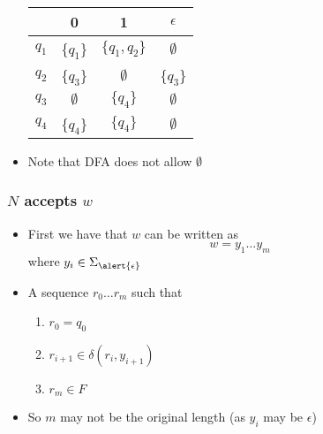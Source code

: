 \begin{frame}[allowframebreaks]
\begin{itemize}
  \begin{center}
  \begin{tabular}{c|ccc}
& 0 & 1 & $\epsilon$\\ 
\hline
$q_1$ & \{$q_1$\} & $\{q_1, q_2\}$ & $\emptyset$\\
$q_2$ & \{$q_3$\} & $\emptyset$ & \{$q_3$\}\\
$q_3$ & $\emptyset$ & $\{q_4\}$ & $\emptyset$\\
$q_4$ & \{$q_4$\} & $\{q_4\}$ & $\emptyset$
  \end{tabular}
\end{center}
\item Note that DFA does not allow $\emptyset$ 
\end{itemize}\end{frame}

\begin{frame}[allowframebreaks] \frametitle{$N$ accepts $w$}
  \begin{itemize}
\item First we have that $w$ can be written as 
  \begin{equation*}
    w = y_1 \ldots y_m
  \end{equation*}
where $y_i \in \Sigma_{\alert{\epsilon}}$
\item A sequence $r_0 \ldots r_m$ such that

  \begin{enumerate}
  \item $r_0=q_0$
  \item $r_{i+1}\in \delta(r_i,y_{i+1})$
  \item $r_m\in F$
  \end{enumerate}
\item So $m$ may not be the original length (as $y_i$ may be
  $\epsilon$)
\end{itemize}\end{frame}



